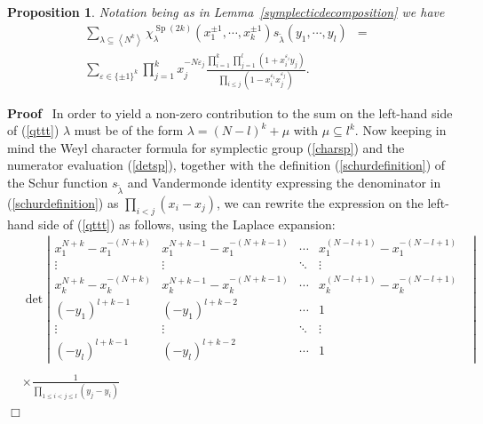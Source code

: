 \documentclass[11pt]{amsart}
\newcommand{\tmop}[1]{\ensuremath{\operatorname{#1}}}
\newtheorem{proposition}{Proposition}
\renewenvironment{proof}{
\noindent\textbf{Proof}\ }{\hspace*{\fill}
\begin{math}\Box\end{math}\medskip}
\begin{document}
\begin{proposition}
  \label{prop:alts}Notation being as in Lemma~\ref{symplecticdecomposition} we
  have
  \begin{eqnarray}
    \sum_{\lambda \subseteq \left\langle N^k \right\rangle}  \chi_{\lambda}^{\tmop{Sp} ( 2 k )} ( x_1^{\pm 1},
    \cdots, x_k^{\pm 1} ) s_{\tilde{\lambda}} ( y_1, \cdots, y_l ) & = &
    \nonumber\\
    \sum_{\varepsilon \in \{ \pm 1 \}^k} \prod_{j = 1}^k x_j^{- N
    \varepsilon_j} \frac{\prod_{i = 1}^k \prod_{j = 1}^l ( 1 +
    x_i^{\varepsilon_i} y_j )}{\prod_{i \leqslant j} ( 1 - x_i^{\varepsilon_i}
    x_j^{\varepsilon_j} )} . &  &  \label{qttt}
  \end{eqnarray}
\end{proposition}

\begin{proof}
  In order to yield a non-zero contribution to the sum on the left-hand side
  of (\ref{qttt}) $\lambda$ must be of the form $\lambda = ( N - l )^k + \mu$
  with $\mu \subseteq l^k$. Now keeping in mind the Weyl character formula for
  symplectic group (\ref{charsp}) and the numerator evaluation (\ref{detsp}),
  together with the definition (\ref{schurdefinition}) of the Schur function
  $s_{\tilde{\lambda}}$ and Vandermonde identity expressing the denominator in
  (\ref{schurdefinition}) as $\prod_{i < j} ( x_i - x_j )$, we can rewrite the
  expression on the left-hand side of (\ref{qttt}) as follows, using the
  Laplace expansion:
\begin{equation*}
\begin{aligned}
    & \det \left| \begin{array}{ccccc}
      x_1^{N+k} - x_1^{- ( N+k)} & x_1^{N+k-1} - x_1^{- (N+k-1)} & \cdots & x_1^{(N-l+1)}
       - x_1^{- ( N-l+1)} & \\
      \vdots & \vdots & \ddots & \vdots & \\
      x_k^{N+k} - x_k^{- ( N+k)} & x_k^{N+k-1} - x_k^{- (N+k-1)} & \cdots & x_k^{(N-l+1)}
       - x_k^{- ( N-l+1)} & \\
      ( - y_1 )^{l + k - 1} &  ( - y_1 )^{l + k - 2}& \cdots & 1 & \\
      \vdots & \vdots & \ddots & \vdots & \\
      ( - y_l )^{l + k - 1} &  ( - y_l )^{l + k - 2}& \cdots & 1 &
    \end{array} \right|  \\
    &\\
    & \times \frac{1}{\prod_{1 \leqslant i < j \leqslant l} ( y_j - y_i )}

\end{aligned}
\end{equation*}
\end{proof}
\end{document}

